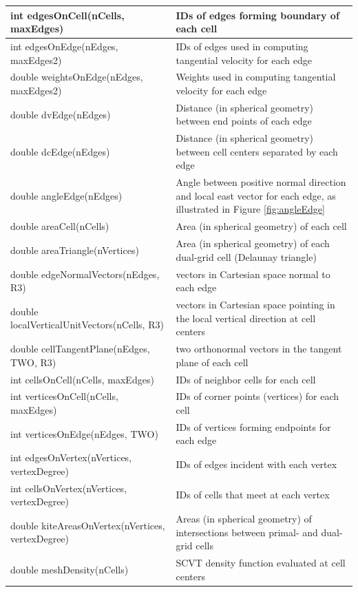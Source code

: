 \documentclass[11pt]{report}
\begin{document}
{\begin{longtable}{|p{2.75in} |p{3.5in}|}
        int edgesOnCell(nCells, maxEdges)   & IDs of edges forming boundary of each cell \\ \hline
        int edgesOnEdge(nEdges, maxEdges2)  & IDs of edges used in computing tangential velocity for each edge \\ \hline
        double \hfil\break weightsOnEdge(nEdges, maxEdges2)  & Weights used in computing tangential velocity for each edge \\ \hline
        double dvEdge(nEdges)            & Distance (in spherical geometry) between end points of each edge \\ \hline
        double dcEdge(nEdges)            & Distance (in spherical geometry) between cell centers separated by each edge \\ \hline
        double angleEdge(nEdges)         & Angle between positive normal direction and local east vector for each edge, as illustrated in Figure \ref{fig:angleEdge} \\ \hline
        double areaCell(nCells)          & Area (in spherical geometry) of each cell \\ \hline
        double areaTriangle(nVertices)   & Area (in spherical geometry) of each dual-grid cell (Delaunay triangle) \\ \hline
        double edgeNormalVectors(nEdges, R3)        & vectors in Cartesian space normal to each edge \\ \hline
        double \hfil\break localVerticalUnitVectors(nCells, R3) & vectors in Cartesian space pointing in the local vertical direction at cell centers \\ \hline
        double \hfil\break cellTangentPlane(nEdges, TWO, R3)    & two orthonormal vectors in the tangent plane of each cell \\ \hline
        int cellsOnCell(nCells, maxEdges)           & IDs of neighbor cells for each cell \\ \hline
        int verticesOnCell(nCells, maxEdges)        & IDs of corner points (vertices) for each cell \\ \hline
        int verticesOnEdge(nEdges, TWO)             & IDs of vertices forming endpoints for each edge \\ \hline
        int edgesOnVertex(nVertices, vertexDegree)  & IDs of edges incident with each vertex \\ \hline
        int cellsOnVertex(nVertices, vertexDegree)  & IDs of cells that meet at each vertex \\ \hline
        double kiteAreasOnVertex(nVertices, vertexDegree)   & Areas (in spherical geometry) of intersections between primal- and dual-grid cells \\ \hline 
        double meshDensity(nCells)   &  SCVT density function evaluated at cell centers \\ \hline
\end{longtable}
}
\end{document}
